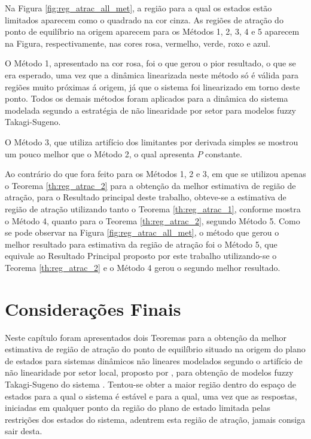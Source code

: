 Na Figura \ref{fig:reg_atrac_all_met}, a região para a qual os estados estão limitados aparecem como o quadrado na cor cinza. As regiões de atração do ponto de equilíbrio na origem aparecem para os Métodos 1, 2, 3, 4 e 5 aparecem na Figura, respectivamente, nas cores rosa, vermelho, verde, roxo e azul.

O Método 1, apresentado na cor rosa, foi o que gerou o pior resultado, o que se era esperado, uma vez que a dinâmica linearizada neste método só é válida para regiões muito próximas á origem, já que o sistema foi linearizado em torno deste ponto. Todos os demais métodos foram aplicados para a dinâmica do sistema modelada segundo a estratégia de não linearidade por setor para modelos fuzzy Takagi-Sugeno.

O Método 3, que utiliza artifício dos limitantes por derivada simples se mostrou um pouco melhor que o Método 2, o qual apresenta $P$ constante. 

Ao contrário do que fora feito para os Métodos 1, 2 e 3, em que se utilizou apenas o Teorema \ref{th:reg_atrac_2} para a obtenção da melhor estimativa de região de atração, para o Resultado principal deste trabalho, obteve-se a estimativa de região de atração utilizando tanto o Teorema \ref{th:reg_atrac_1}, conforme mostra o Método 4, quanto para o Teorema \ref{th:reg_atrac_2}, segundo Método 5.
Como se pode observar na Figura \ref{fig:reg_atrac_all_met}, o método que gerou o melhor resultado para estimativa da região de atração foi o  Método 5, que equivale ao Resultado Principal proposto por este trabalho utilizando-se o Teorema  \ref{th:reg_atrac_2} e o Método 4 gerou o segundo melhor resultado. 



\section{Considerações Finais}

Neste capítulo foram apresentados dois Teoremas para a obtenção da melhor estimativa de região de atração do ponto de equilíbrio situado na origem do plano de estados para sistemas dinâmicos não lineares modelados segundo o artifício de não linearidade por setor local, proposto por \cite{booktw:2003}, para obtenção de modelos fuzzy Takagi-Sugeno do sistema \cite{articlets:1985}. Tentou-se obter a maior região dentro do espaço de estados para a qual o sistema é estável e para a qual, uma vez que as respostas, iniciadas em qualquer ponto da região do plano de estado limitada pelas restrições dos estados do sistema, adentrem esta região de atração, jamais consiga sair desta.

